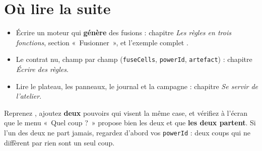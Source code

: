 \section{Où lire la suite}

\begin{itemize}
  \item Écrire un moteur qui \textbf{génère} des fusions : chapitre \emph{Les
        règles en trois fonctions}, section «~Fusionner~», et l'exemple complet
        .
  \item Le contrat nu, champ par champ (\texttt{fuseCells}, \texttt{powerId},
        \texttt{artefact}) : chapitre \emph{Écrire des règles}.
  \item Lire le plateau, les panneaux, le journal et la campagne : chapitre
        \emph{Se servir de l'atelier}.
\end{itemize}

\begin{nkexo}
Reprenez , ajoutez \textbf{deux} pouvoirs qui visent la
même case, et vérifiez à l'écran que le menu «~Quel coup ?~» propose bien les
deux et que \textbf{les deux partent}. Si l'un des deux ne part jamais, regardez
d'abord vos \texttt{powerId} : deux coups qui ne diffèrent par rien sont un seul
coup.
\end{nkexo}
